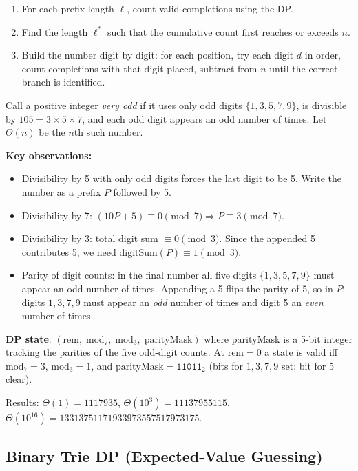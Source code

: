 \begin{enumerate}
    \item For each prefix length $\ell$, count valid completions using the DP.
    \item Find the length $\ell^*$ such that the cumulative count first reaches or exceeds $n$.
    \item Build the number digit by digit: for each position, try each digit $d$ in order, count completions with that digit placed, subtract from $n$ until the correct branch is identified.
\end{enumerate}

\begin{example}
Call a positive integer \emph{very odd} if it uses only odd digits $\{1,3,5,7,9\}$, is divisible by $105 = 3 \times 5 \times 7$, and each odd digit appears an odd number of times. Let $\Theta(n)$ be the $n$th such number.

\textbf{Key observations:}
\begin{itemize}
    \item Divisibility by 5 with only odd digits forces the last digit to be 5. Write the number as a prefix $P$ followed by 5.
    \item Divisibility by 7: $(10P + 5) \equiv 0 \pmod 7 \Rightarrow P \equiv 3 \pmod 7$.
    \item Divisibility by 3: total digit sum $\equiv 0 \pmod 3$. Since the appended 5 contributes 5, we need $\text{digitSum}(P) \equiv 1 \pmod 3$.
    \item Parity of digit counts: in the final number all five digits $\{1,3,5,7,9\}$ must appear an odd number of times. Appending a 5 flips the parity of 5, so in $P$: digits $1,3,7,9$ must appear an \emph{odd} number of times and digit 5 an \emph{even} number of times.
\end{itemize}

\textbf{DP state}: $(\text{rem},\; \text{mod}_7,\; \text{mod}_3,\; \text{parityMask})$ where $\text{parityMask}$ is a 5-bit integer tracking the parities of the five odd-digit counts. At $\text{rem}=0$ a state is valid iff $\text{mod}_7 = 3$, $\text{mod}_3 = 1$, and $\text{parityMask} = \texttt{11011}_2$ (bits for $1,3,7,9$ set; bit for 5 clear).

Results: $\Theta(1) = 1117935$, $\Theta(10^3) = 11137955115$, $\Theta(10^{16}) = 13313751171933973557517973175$.
\end{example}

\subsection{Binary Trie DP (Expected-Value Guessing)}


